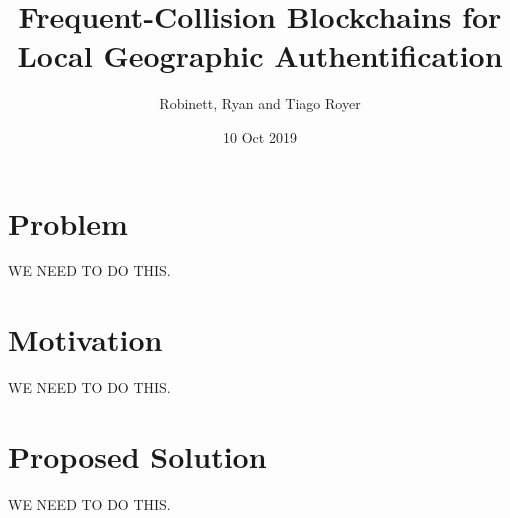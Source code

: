 \documentclass{article}
\title{Frequent-Collision Blockchains for Local Geographic Authentification}
\author{Robinett, Ryan and Tiago Royer}
\date{10 Oct 2019}
\begin{document}
\maketitle

\section*{Problem}
WE NEED TO DO THIS.

\section*{Motivation}
WE NEED TO DO THIS.

\section*{Proposed Solution}
WE NEED TO DO THIS.
\end{document}
